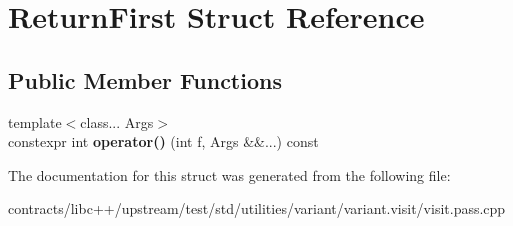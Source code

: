 \hypertarget{struct_return_first}{}\section{Return\+First Struct Reference}
\label{struct_return_first}
\subsection*{Public Member Functions}
\begin{DoxyCompactItemize}
\item 
\mbox{\label{struct_return_first_a9636568f4e5f3aa7c776bb9fe3fda344}} 
{\footnotesize template$<$class... Args$>$ }\\constexpr int {\bfseries operator()} (int f, Args \&\&...) const
\end{DoxyCompactItemize}


The documentation for this struct was generated from the following file\+:\begin{DoxyCompactItemize}
\item 
contracts/libc++/upstream/test/std/utilities/variant/variant.\+visit/visit.\+pass.\+cpp\end{DoxyCompactItemize}
